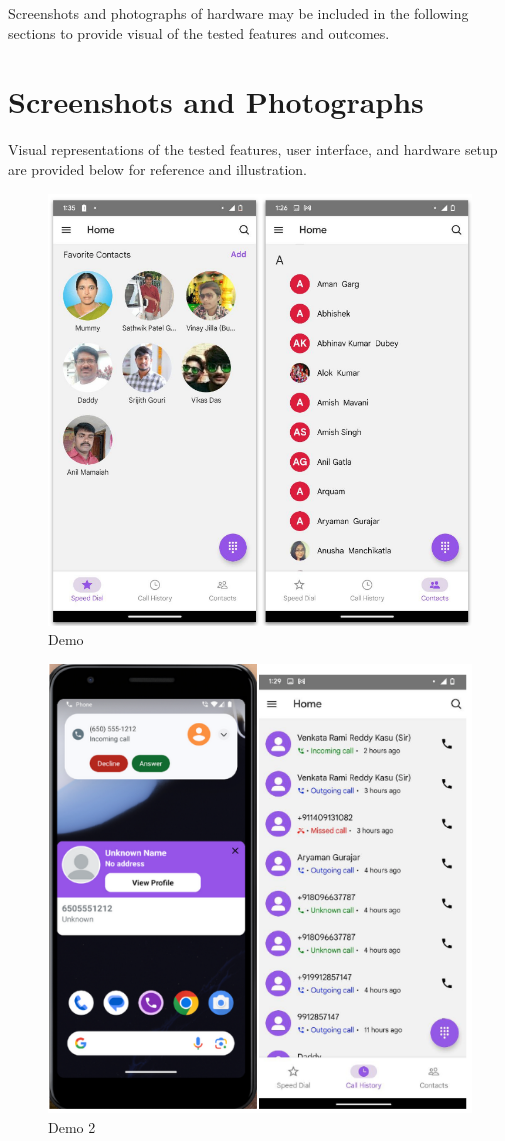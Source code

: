 Screenshots and photographs of hardware may be included in the following sections to provide visual  of the tested features and outcomes.

\section{Screenshots and Photographs}

Visual representations of the tested features, user interface, and hardware setup are provided below for reference and illustration.

\begin{figure}
    \centering
    \includegraphics[width=1\linewidth]{Media//demo.png}
    \caption{Demo}
    \label{fig:App demo image}
\end{figure}


\begin{figure}
    \centering
    \includegraphics[width=1\linewidth]{Media/demo2.png}
    \caption{Demo 2}
    \label{fig:App Start}
\end{figure}